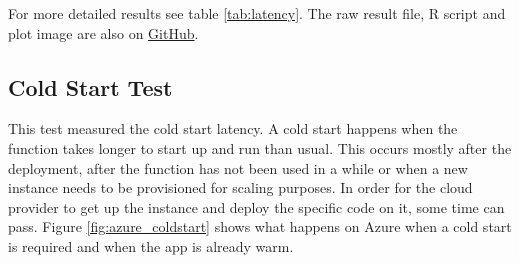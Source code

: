 For more detailed results see table \ref{tab:latency}. The raw result file, R script and plot image are also on \href{https://github.com/Bschitter/benchmark-suite-serverless-computing/tree/master/results/1-latency}{GitHub}.

\subsection{Cold Start Test}
\label{sec:coldstart}
This test measured the cold start latency. A cold start happens when the function takes longer to start up and run than usual. This occurs mostly after the deployment, after the function has not been used in a while or when a new instance needs to be provisioned for scaling purposes. In order for the cloud provider to get up the instance and deploy the specific code on it, some time can pass. Figure \ref{fig:azure_coldstart} shows what happens on Azure when a cold start is required and when the app is already warm.

